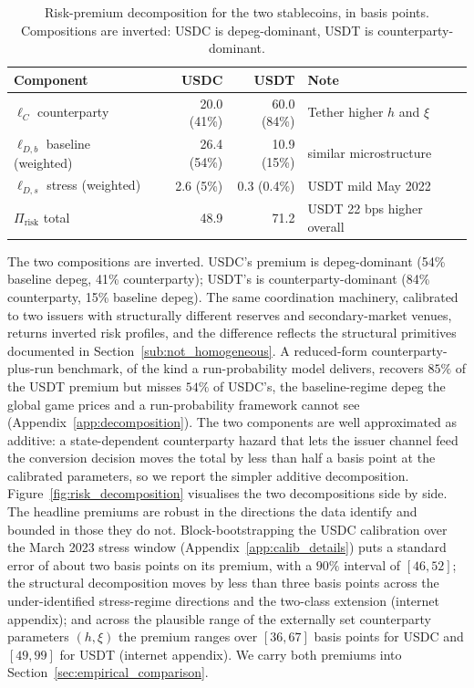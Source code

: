 \begin{table}[H]
\centering
\caption{Risk-premium decomposition for the two stablecoins, in basis points. Compositions are inverted: USDC is depeg-dominant, USDT is counterparty-dominant.}\label{tab:dual_asset_premium}
\begin{tabular}{lrrl}
\toprule
Component & USDC & USDT & Note \\
\midrule
$\ell_C$ counterparty                 & 20.0 (41\%) & 60.0 (84\%) & Tether higher $h$ and $\xi$ \\
$\ell_{D,b}$ baseline (weighted)      & 26.4 (54\%) & 10.9 (15\%) & similar microstructure \\
$\ell_{D,s}$ stress (weighted)        & 2.6  (5\%)  & 0.3 (0.4\%) & USDT mild May 2022 \\
$\Pi_{\text{risk}}$ total             & 48.9        & 71.2        & USDT 22 bps higher overall \\
\bottomrule
\end{tabular}
\end{table}

The two compositions are inverted. USDC's premium is depeg-dominant (54\% baseline depeg, 41\% counterparty); USDT's is counterparty-dominant (84\% counterparty, 15\% baseline depeg). The same coordination machinery, calibrated to two issuers with structurally different reserves and secondary-market venues, returns inverted risk profiles, and the difference reflects the structural primitives documented in Section~\ref{sub:not_homogeneous}. A reduced-form counterparty-plus-run benchmark, of the kind a run-probability model delivers, recovers $85\%$ of the USDT premium but misses $54\%$ of USDC's, the baseline-regime depeg the global game prices and a run-probability framework cannot see (Appendix~\ref{app:decomposition}). The two components are well approximated as additive: a state-dependent counterparty hazard that lets the issuer channel feed the conversion decision moves the total by less than half a basis point at the calibrated parameters, so we report the simpler additive decomposition. Figure~\ref{fig:risk_decomposition} visualises the two decompositions side by side. The headline premiums are robust in the directions the data identify and bounded in those they do not. Block-bootstrapping the USDC calibration over the March 2023 stress window (Appendix~\ref{app:calib_details}) puts a standard error of about two basis points on its premium, with a $90\%$ interval of $[46,52]$; the structural decomposition moves by less than three basis points across the under-identified stress-regime directions and the two-class extension (internet appendix); and across the plausible range of the externally set counterparty parameters $(h,\xi)$ the premium ranges over $[36,67]$ basis points for USDC and $[49,99]$ for USDT (internet appendix). We carry both premiums into Section~\ref{sec:empirical_comparison}.

